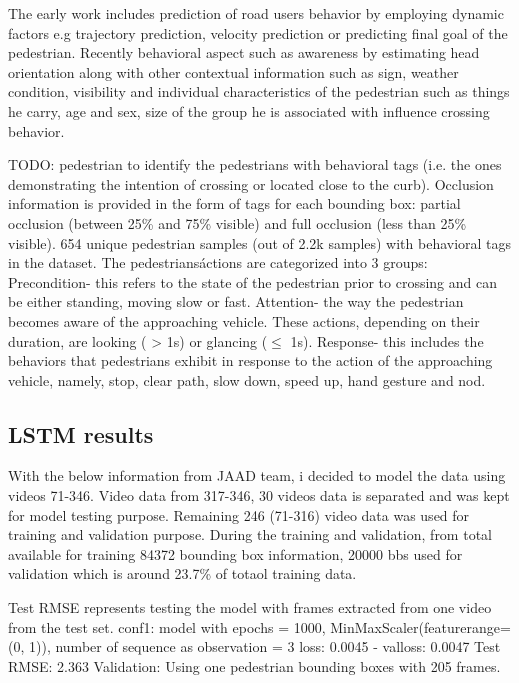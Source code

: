The early work includes prediction of road users behavior by employing dynamic factors e.g trajectory prediction, velocity prediction or predicting final goal of the pedestrian. Recently behavioral aspect such as awareness by estimating head orientation along with other contextual information such as sign, weather condition, visibility and individual characteristics of the pedestrian such as things he carry, age and sex, size of the group he is associated with influence crossing behavior.

TODO:  pedestrian to identify the pedestrians with behavioral tags (i.e. the ones demonstrating the intention of crossing or located close to the curb). 
Occlusion information is provided in the form of tags for
each bounding box: partial occlusion (between 25\% and 75\%
visible) and full occlusion (less than 25\% visible).
 654 unique pedestrian samples (out of 2.2k samples) with behavioral tags in the
dataset. 
The
pedestrians\' actions are categorized into 3 groups: Precondition- this refers to the state of the pedestrian prior to crossing and can be either standing, moving slow or fast. Attention- the way the pedestrian becomes aware of the approaching vehicle. These actions, depending on their duration, are looking ( > 1s) or glancing ($\leq$ 1s). Response- this
includes the behaviors that pedestrians exhibit in response
to the action of the approaching vehicle, namely, stop, clear path, slow down, speed up, hand gesture and nod.

\subsection{LSTM results}
With the below information from JAAD team, i decided to model the data using videos 71-346.
Video data from 317-346, 30 videos data is separated and was kept for model testing purpose.
Remaining 246 (71-316) video data was used for training and validation purpose.
During the training and validation, from total available for training 84372 bounding box information, 20000 bbs used for validation which is around 23.7\% of totaol training data.

Test RMSE represents testing the model with frames extracted from one video from the test set.
conf1: model with epochs = 1000, MinMaxScaler(feature\textunderscore range=(0, 1)), 
number of sequence as observation = 3
loss: 0.0045 - val\textunderscore loss: 0.0047 
Test RMSE: 2.363
Validation: Using one pedestrian bounding boxes with 205 frames.

